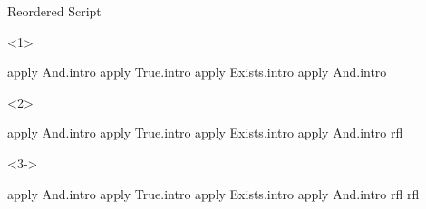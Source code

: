 \begin{frame}[fragile]
\begin{columns}[onlytextwidth,t]
    \begin{column}{.38\textwidth}
      \begin{block}{Reordered Script}
        \begin{onlyenv}<1>
          \begin{leancode}
            apply And.intro
            apply True.intro
            apply Exists.intro
            apply And.intro


          \end{leancode}
        \end{onlyenv}
        \begin{onlyenv}<2>
          \begin{leancode}[highlightlines=5]
            apply And.intro
            apply True.intro
            apply Exists.intro
            apply And.intro
            rfl

          \end{leancode}
        \end{onlyenv}
        \begin{onlyenv}<3->
          \begin{leancode}[highlightlines=6]
            apply And.intro
            apply True.intro
            apply Exists.intro
            apply And.intro
            rfl
            rfl
          \end{leancode}
        \end{onlyenv}
      \end{block}
    \end{column}
  \end{columns}
\end{frame}

\begin{frame}
\end{frame}


